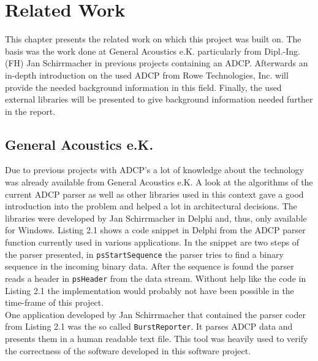 \chapter{Related Work}
This chapter presents the related work on which this project was built on. The basis was the work done at General Acoustics e.K. particularly from Dipl.-Ing. (FH) Jan Schirrmacher in previous projects containing an ADCP. Afterwards an in-depth introduction on the used ADCP from Rowe Technologies, Inc.\cite{rowe} will provide the needed background information in this field. Finally, the used external libraries will be presented to give background information needed further in the report.

\section{General Acoustics e.K.}
Due to previous projects with ADCP's a lot of knowledge about the technology was already available from General Acoustics e.K. A look at the algorithms of the current ADCP parser as well as other libraries used in this context gave a good introduction into the problem and helped a lot in architectural decisions. The libraries were developed by Jan Schirrmacher in Delphi and, thus, only available for Windows. Listing 2.1 shows a code snippet in Delphi from the ADCP parser function currently used in various applications. In the snippet are two steps of the parser presented, in \texttt{psStartSequence} the parser tries to find a binary sequence in the incoming binary data. After the sequence is found the parser reads a header in \texttt{psHeader} from the data stream. Without help like the code in Listing 2.1 the implementation would probably not have been possible in the time-frame of this project.\\
One application developed by Jan Schirrmacher that contained the parser coder from Listing 2.1 was the so called \texttt{BurstReporter}. It parses ADCP data and presents them in a human readable text file. This tool was heavily used to verify the correctness of the software developed in this software project.


